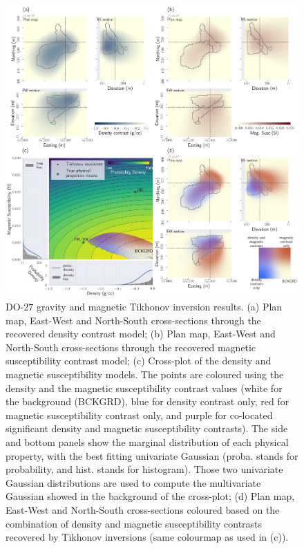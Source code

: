 \documentclass[extra, mreferee]{gji_joint} %
\begin{document}
\begin{figure}
    \centering
    \includegraphics[width=\textwidth]{Fig/LowRes/TKC_L2_Synthetic.png}
    \caption{DO-$27$ gravity and magnetic Tikhonov inversion results. (a) Plan map, East-West and North-South cross-sections through the recovered density contrast model; (b) Plan map, East-West and North-South cross-sections through the recovered magnetic susceptibility contrast model; (c) Cross-plot of the density and magnetic susceptibility models. The points are coloured using the density and the magnetic susceptibility contrast values (white for the background (BCKGRD), blue for density contrast only, red for magnetic susceptibility contrast only, and purple for co-located significant density and magnetic susceptibility contrasts). The side and bottom panels show the marginal distribution of each physical property, with the best fitting univariate Gaussian (proba. stands for probability, and hist. stands for histogram). Those two univariate Gaussian distributions are used to compute the multivariate Gaussian showed in the background of the cross-plot; (d) Plan map, East-West and North-South cross-sections coloured based on the combination of density and magnetic susceptibility contrasts recovered by Tikhonov inversions (same colourmap as used in (c)).}
    \label{fig:TKC_L2_Synthetic.png}
\end{figure}
\end{document}
